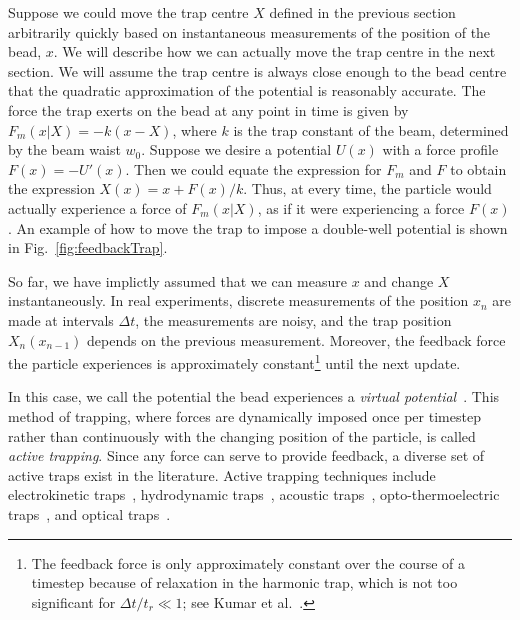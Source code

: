 \documentclass[hyperref={colorlinks=true, urlcolor=blue, citecolor=blue, final, bound}]{sfuthesis}
\begin{document}
Suppose we could move the trap centre $X$ defined in the previous section arbitrarily quickly based on instantaneous measurements of the position of the bead, $x$. We will describe how we can actually move the trap centre in the next section. We will assume the trap centre is always close enough to the bead centre that the quadratic approximation of the potential is reasonably accurate. The force the trap exerts on the bead at any point in time is given by $F_m(x|X)=-k(x-X)$, where $k$ is the trap constant of the beam, determined by the beam waist $w_0$. Suppose we desire a potential $U(x)$ with a force profile $F(x)=-U'(x)$. Then we could equate the expression for $F_m$ and $F$ to obtain the expression $X(x) = x+F(x)/k$. Thus, at every time, the particle would actually experience a force of $F_m(x|X)$, as if it were experiencing a force $F(x)$. An example of how to move the trap to impose a double-well potential is shown in Fig.~\ref{fig:feedbackTrap}. 

So far, we have implictly assumed that we can measure $x$ and change $X$ instantaneously. In real experiments, discrete measurements of the position $x_n$ are made at intervals $\Delta t$, the measurements are noisy, and the trap position $X_n(x_{n-1})$ depends on the previous measurement. Moreover, the feedback force the particle experiences is approximately constant\footnote{The feedback force is only approximately constant over the course of a timestep because of relaxation in the harmonic trap, which is not too significant for $\Delta t/t_r \ll 1$; see Kumar et al.~\cite{Kumar2018}.} until the next update. 

In this case, we call the potential the bead experiences a \textit{virtual potential}~\cite{Jun2012}. This method of trapping, where forces are dynamically imposed once per timestep rather than continuously with the changing position of the particle, is called \textit{active trapping}. Since any force can serve to provide feedback, a diverse set of active traps exist in the literature. Active trapping techniques include electrokinetic traps~\cite{Cohen2005}, hydrodynamic traps~\cite{Narayanamurthy2017}, acoustic traps~\cite{Melde2016}, opto-thermoelectric traps~\cite{Lin2018}, and optical traps~\cite{Kumar2018}. 
\end{document}
